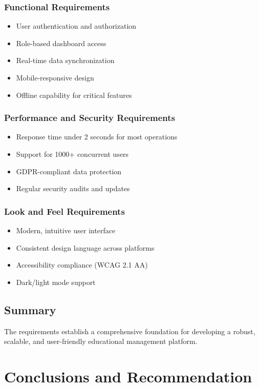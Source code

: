 \subsubsection{Functional Requirements}
\begin{itemize}
\item User authentication and authorization
\item Role-based dashboard access
\item Real-time data synchronization
\item Mobile-responsive design
\item Offline capability for critical features
\end{itemize}

\subsubsection{Performance and Security Requirements}
\begin{itemize}
\item Response time under 2 seconds for most operations
\item Support for 1000+ concurrent users
\item GDPR-compliant data protection
\item Regular security audits and updates
\end{itemize}

\subsubsection{Look and Feel Requirements}
\begin{itemize}
\item Modern, intuitive user interface
\item Consistent design language across platforms
\item Accessibility compliance (WCAG 2.1 AA)
\item Dark/light mode support
\end{itemize}

\subsection{Summary}
The requirements establish a comprehensive foundation for developing a robust, scalable, and user-friendly educational management platform.

\newpage
\section{Conclusions and Recommendation}


